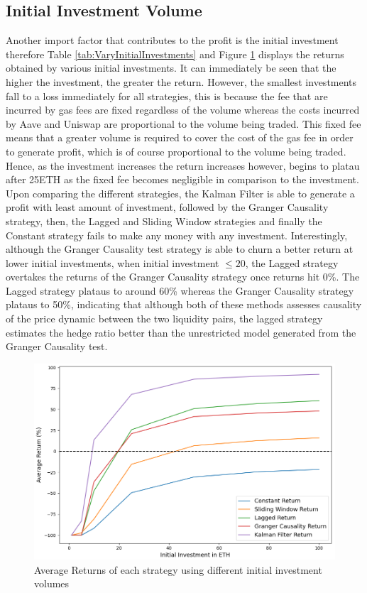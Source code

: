 \subsection{Initial Investment Volume}
Another import factor that contributes to the profit is the initial investment therefore Table \ref{tab:VaryInitialInvestments} and Figure \ref{fig:VaryInitialInvestments} displays the returns obtained by various initial investments. It can immediately be seen that the higher the investment, the greater the return. However, the smallest investments fall to a loss immediately for all strategies, this is because the fee that are incurred by gas fees are fixed regardless of the volume whereas the costs incurred by Aave and Uniswap are proportional to the volume being traded. This fixed fee means that a greater volume is required to cover the cost of the gas fee in order to generate profit, which is of course proportional to the volume being traded. Hence, as the investment increases the return increases however, begins to platau after 25ETH as the fixed fee becomes negligible in comparison to the investment.
\\[3mm]
Upon comparing the different strategies, the Kalman Filter is able to generate a profit with least amount of investment, followed by the Granger Causality strategy, then, the Lagged and Sliding Window strategies and finally the Constant strategy fails to make any money with any investment. Interestingly, although the Granger Causality test strategy is able to churn a better return at lower initial investments, when initial investment $\leq 20$, the Lagged strategy overtakes the returns of the Granger Causality strategy once returns hit 0\%. The Lagged strategy plataus to around 60\% whereas the Granger Causality strategy plataus to 50\%, indicating that although both of these methods assesses causality of the price dynamic between the two liquidity pairs, the lagged strategy estimates the hedge ratio better than the unrestricted model generated from the Granger Causality test.

\begin{figure}[H]
    \centering
    \includegraphics[width=\linewidth]{evaluation/Images/VaryII.png}
    \caption{Average Returns of each strategy using different initial investment volumes}
    \label{fig:VaryInitialInvestments}
\end{figure}

